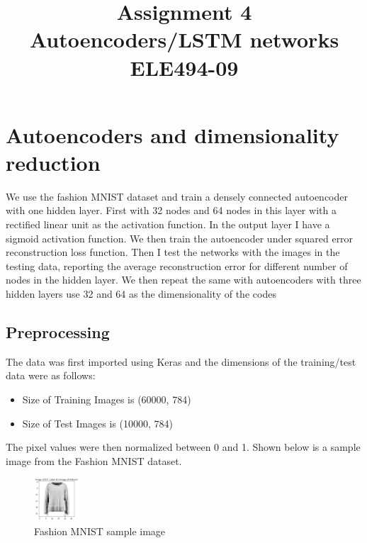 \documentclass[conference]{IEEEtran}
\begin{document}
 
    \title{
        Assignment 4\\[0.3cm]
        \large  Autoencoders/LSTM networks\\
        ELE494-09
    }

    \author{
    }

    \maketitle

    \section{Autoencoders and dimensionality reduction}

    We use the fashion MNIST dataset and train a densely connected autoencoder with one hidden layer.
    First with 32 nodes and 64 nodes in this layer with a rectified linear unit as the activation function.
    In the output layer I have a sigmoid activation function. We then train the autoencoder under
    squared error reconstruction loss function. Then I test the networks with the images in the testing
    data, reporting the average reconstruction error for different number of nodes in the hidden layer.
    We then repeat the same with autoencoders with three hidden layers use 32 and 64 as the
    dimensionality of the codes

    \subsection{Preprocessing}

    The data was first imported using Keras and the dimensions of the training/test data were as follows:
    \begin{itemize}
        \item Size of Training Images is (60000, 784)
        \item Size of Test Images is (10000, 784)
    \end{itemize} 
    The pixel values were then normalized between 0 and 1. Shown below is a sample image from
    the Fashion MNIST dataset.

    \begin{figure}[H]
        \centering
        \captionsetup{justification=centering}
        \centering
            \includegraphics[width=0.15\textwidth]{1.png}
            \caption{Fashion MNIST sample image}
    \end{figure}
\end{document}
